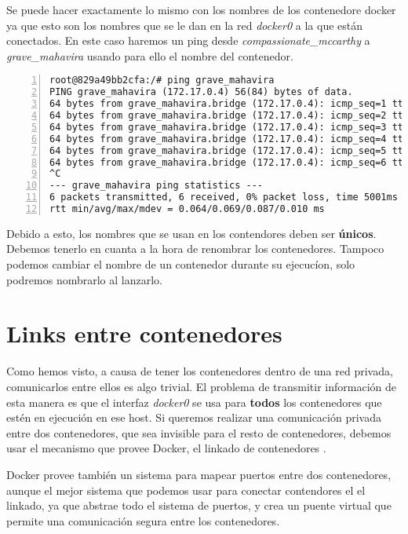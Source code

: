 	Se puede hacer exactamente lo mismo con los nombres de los contenedore docker ya que esto son los nombres que se le dan en la red \emph{docker0} a la que están conectados. En este caso haremos un ping desde \textit{compassionate\_mccarthy} a \textit{grave\_mahavira} usando para ello el nombre del contenedor.
	
	\begin{lstlisting}[style=consola,numbers=left]
root@829a49bb2cfa:/# ping grave_mahavira
PING grave_mahavira (172.17.0.4) 56(84) bytes of data.
64 bytes from grave_mahavira.bridge (172.17.0.4): icmp_seq=1 ttl=64 time=0.087 ms
64 bytes from grave_mahavira.bridge (172.17.0.4): icmp_seq=2 ttl=64 time=0.066 ms
64 bytes from grave_mahavira.bridge (172.17.0.4): icmp_seq=3 ttl=64 time=0.066 ms
64 bytes from grave_mahavira.bridge (172.17.0.4): icmp_seq=4 ttl=64 time=0.067 ms
64 bytes from grave_mahavira.bridge (172.17.0.4): icmp_seq=5 ttl=64 time=0.066 ms
64 bytes from grave_mahavira.bridge (172.17.0.4): icmp_seq=6 ttl=64 time=0.064 ms
^C
--- grave_mahavira ping statistics ---
6 packets transmitted, 6 received, 0% packet loss, time 5001ms
rtt min/avg/max/mdev = 0.064/0.069/0.087/0.010 ms
	\end{lstlisting}
	
	Debido a esto, los nombres que se usan en los contendores deben ser \textbf{únicos}. Debemos tenerlo en cuanta a la hora de renombrar los contenedores. Tampoco podemos cambiar el nombre de un  contenedor durante su ejecucíon, solo podremos nombrarlo al lanzarlo.
	
	\section{Links entre contenedores}
	Como hemos visto, a causa de tener los contenedores dentro de una red privada, comunicarlos entre ellos es algo trivial. El problema de transmitir información de esta manera es que el interfaz \emph{docker0} se usa para \textbf{todos} los contenedores que estén en ejecución en ese host. Si queremos realizar una comunicación privada entre dos contenedores, que sea invisible para el resto de contenedores, debemos usar el mecanismo que provee Docker, el linkado de contenedores \cite{docker-network-linking}.
	
	Docker provee también un sistema para mapear puertos entre dos contenedores, aunque el mejor sistema que podemos usar para conectar contendores el el linkado, ya que abstrae todo el sistema de puertos, y crea un puente virtual que permite una comunicación segura entre los contenedores.
	
